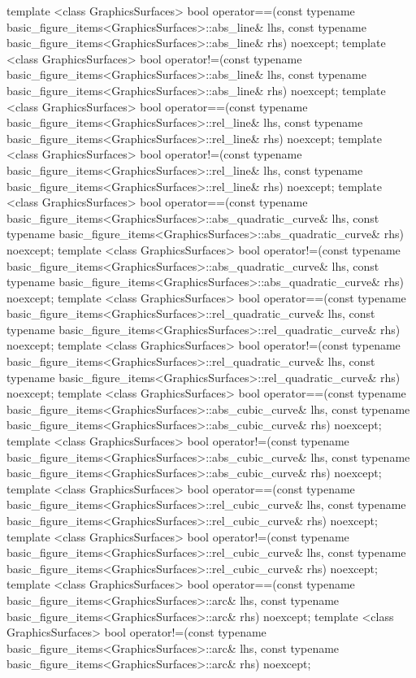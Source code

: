 \begin{codeblock}
{  template <class GraphicsSurfaces>
  bool operator==(const typename basic_figure_items<GraphicsSurfaces>::abs_line& lhs,
    const typename basic_figure_items<GraphicsSurfaces>::abs_line& rhs) noexcept;
  template <class GraphicsSurfaces>
  bool operator!=(const typename basic_figure_items<GraphicsSurfaces>::abs_line& lhs,
    const typename basic_figure_items<GraphicsSurfaces>::abs_line& rhs) noexcept;
  template <class GraphicsSurfaces>
  bool operator==(const typename basic_figure_items<GraphicsSurfaces>::rel_line& lhs,
    const typename basic_figure_items<GraphicsSurfaces>::rel_line& rhs) noexcept;
  template <class GraphicsSurfaces>
  bool operator!=(const typename basic_figure_items<GraphicsSurfaces>::rel_line& lhs,
    const typename basic_figure_items<GraphicsSurfaces>::rel_line& rhs) noexcept;
  template <class GraphicsSurfaces>
  bool operator==(const typename basic_figure_items<GraphicsSurfaces>::abs_quadratic_curve& lhs,
    const typename basic_figure_items<GraphicsSurfaces>::abs_quadratic_curve& rhs) noexcept;
  template <class GraphicsSurfaces>
  bool operator!=(const typename basic_figure_items<GraphicsSurfaces>::abs_quadratic_curve& lhs,
    const typename basic_figure_items<GraphicsSurfaces>::abs_quadratic_curve& rhs) noexcept;
  template <class GraphicsSurfaces>
  bool operator==(const typename basic_figure_items<GraphicsSurfaces>::rel_quadratic_curve& lhs,
    const typename basic_figure_items<GraphicsSurfaces>::rel_quadratic_curve& rhs) noexcept;
  template <class GraphicsSurfaces>
  bool operator!=(const typename basic_figure_items<GraphicsSurfaces>::rel_quadratic_curve& lhs,
    const typename basic_figure_items<GraphicsSurfaces>::rel_quadratic_curve& rhs) noexcept;
  template <class GraphicsSurfaces>
  bool operator==(const typename basic_figure_items<GraphicsSurfaces>::abs_cubic_curve& lhs,
    const typename basic_figure_items<GraphicsSurfaces>::abs_cubic_curve& rhs) noexcept;
  template <class GraphicsSurfaces>
  bool operator!=(const typename basic_figure_items<GraphicsSurfaces>::abs_cubic_curve& lhs,
    const typename basic_figure_items<GraphicsSurfaces>::abs_cubic_curve& rhs) noexcept;
  template <class GraphicsSurfaces>
  bool operator==(const typename basic_figure_items<GraphicsSurfaces>::rel_cubic_curve& lhs,
    const typename basic_figure_items<GraphicsSurfaces>::rel_cubic_curve& rhs) noexcept;
  template <class GraphicsSurfaces>
  bool operator!=(const typename basic_figure_items<GraphicsSurfaces>::rel_cubic_curve& lhs,
    const typename basic_figure_items<GraphicsSurfaces>::rel_cubic_curve& rhs) noexcept;
  template <class GraphicsSurfaces>
  bool operator==(const typename basic_figure_items<GraphicsSurfaces>::arc& lhs,
    const typename basic_figure_items<GraphicsSurfaces>::arc& rhs) noexcept;
  template <class GraphicsSurfaces>
  bool operator!=(const typename basic_figure_items<GraphicsSurfaces>::arc& lhs,
    const typename basic_figure_items<GraphicsSurfaces>::arc& rhs) noexcept;
}
\end{codeblock}
